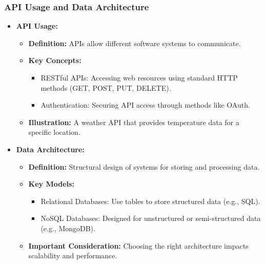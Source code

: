 \documentclass[aspectratio=169]{beamer}
\begin{document}
\begin{frame}[fragile]
    \frametitle{API Usage and Data Architecture}
    \begin{itemize}
        \item \textbf{API Usage:}
        \begin{itemize}
            \item \textbf{Definition:} APIs allow different software systems to communicate.
            \item \textbf{Key Concepts:}
            \begin{itemize}
                \item RESTful APIs: Accessing web resources using standard HTTP methods (GET, POST, PUT, DELETE).
                \item Authentication: Securing API access through methods like OAuth.
            \end{itemize}
            \item \textbf{Illustration:} A weather API that provides temperature data for a specific location.
        \end{itemize}
        \item \textbf{Data Architecture:}
        \begin{itemize}
            \item \textbf{Definition:} Structural design of systems for storing and processing data.
            \item \textbf{Key Models:}
            \begin{itemize}
                \item Relational Databases: Use tables to store structured data (e.g., SQL).
                \item NoSQL Databases: Designed for unstructured or semi-structured data (e.g., MongoDB).
            \end{itemize}
            \item \textbf{Important Consideration:} Choosing the right architecture impacts scalability and performance.
        \end{itemize}
    \end{itemize}
\end{frame}
\end{document}
